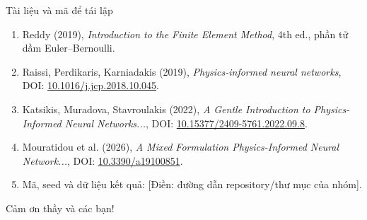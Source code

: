 \documentclass[10pt,aspectratio=169]{beamer}
\newcommand{\todo}[1]{{\color{red!70!black}[Điền: #1]}}
\begin{document}
\begin{frame}{Tài liệu và mã để tái lập}
\small
\begin{enumerate}
\item Reddy (2019), \emph{Introduction to the Finite Element Method}, 4th ed., phần tử dầm Euler--Bernoulli.
\item Raissi, Perdikaris, Karniadakis (2019), \emph{Physics-informed neural networks}, DOI: \href{https://doi.org/10.1016/j.jcp.2018.10.045}{10.1016/j.jcp.2018.10.045}.
\item Katsikis, Muradova, Stavroulakis (2022), \emph{A Gentle Introduction to Physics-Informed Neural Networks...}, DOI: \href{https://doi.org/10.15377/2409-5761.2022.09.8}{10.15377/2409-5761.2022.09.8}.
\item Mouratidou et al. (2026), \emph{A Mixed Formulation Physics-Informed Neural Network...}, DOI: \href{https://doi.org/10.3390/a19100851}{10.3390/a19100851}.
\item Mã, seed và dữ liệu kết quả: \todo{đường dẫn repository/thư mục của nhóm}.
\end{enumerate}
\vspace{5mm}
\begin{center}\Large Cảm ơn thầy và các bạn!\end{center}
\end{frame}
\end{document}

